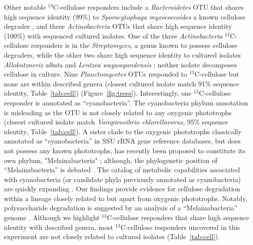 Other notable $^{13}$C-cellulose responders include a \textit{Bacteroidetes}
OTU that shares high sequence identity (99\%) to \textit{Sporocytophaga
myxococcoides} a known cellulose degrader \citep{Vance_1980}, and three
\textit{Actinobacteria} OTUs that share high sequence identity (100\%) with
sequenced cultured isolates. One of the three \textit{Actinobacteria}
$^{13}$C-cellulose responders is in the \textit{Streptomyces}, a genus known to
possess cellulose degraders, while the other two share high sequence identity
to cultured isolates \textit{Allokutzneriz albata} \citep{Labeda_2008,
Tomita_1993} and \textit{Lentzea waywayandensis} \citep{LABEDA_1989,
Labeda_2001}; neither isolate decomposes cellulose in culture. Nine
\textit{Planctomycetes} OTUs responded to $^{13}$C-cellulose but none are within
described genera (closest cultured isolate match 91\% sequence identity,
Table~\ref{tab:cell}) (Figure~\ref{fig:trees}). Interestingly, one
$^{13}$C-cellulose responder is annotated as ``cyanobacteria''.
The cyanobacteria phylum annotation is misleading as the OTU is not closely
related to any oxygenic phototrophs (closest cultured isolate match
\textit{Vampirovibrio chlorellavorus}, 95\% sequence identity,
Table~\ref{tab:cell}). A sister clade to the oxygenic phototrophs classically
annotated as ``cyanobacteria'' in SSU rRNA gene reference databases, but does
not possess any known phototrophs, has recently been proposed to constitute its own
phylum, "Melainabacteria" \citet{Di_Rienzi_2013}; although, the phylogenetic
position of ``Melainabacteria'' is debated \citep{Soo_2014}. The catalog of
metabolic capabilities associated with cyanobacteria (or candidate phyla
previously annotated as cyanobacteria) are quickly expanding
\citep{Di_Rienzi_2013, Soo_2014}. Our findings provide evidence for cellulose
degradation within a lineage closely related to but apart from oxygenic
phototrophs. Notably, polysaccharide degradation is suggested by an analysis of
a ``Melainabacteria'' genome \citep{Di_Rienzi_2013}. Although we highlight
$^{13}$C-cellulose responders that share high sequence identity with described
genera, most $^{13}$C-cellulose responders uncovered in this experiment are not
closely related to cultured isolates (Table~\ref{tab:cell}).

